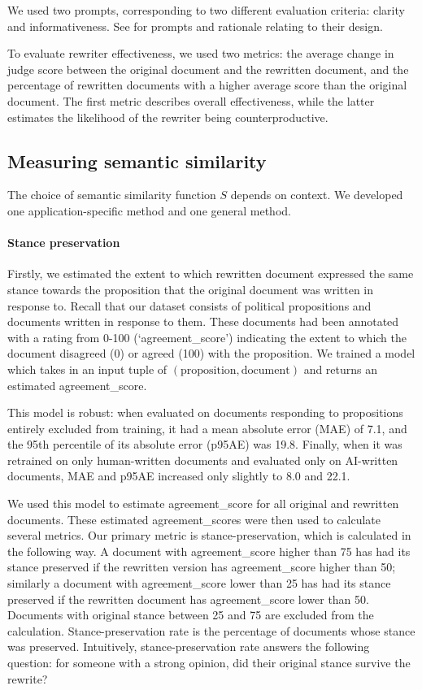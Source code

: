 \documentclass{article}
\begin{document}


We used two prompts, corresponding to two different evaluation criteria: clarity and informativeness. See  for prompts and rationale relating to their design.

To evaluate rewriter effectiveness, we used two metrics: the average change in judge score between the original document and the rewritten document, and the percentage of rewritten documents with a higher average score than the original document. The first metric describes overall effectiveness, while the latter estimates the likelihood of the rewriter being counterproductive.

\subsection{Measuring semantic similarity}

The choice of semantic similarity function $S$ depends on context. We developed one application-specific method and one general method.

\paragraph{Stance preservation} Firstly, we estimated the extent to which rewritten document expressed the same stance towards the proposition that the original document was written in response to. Recall that our dataset consists of political propositions and documents written in response to them. These documents had been annotated with a rating from 0-100 (`agreement\_score') indicating the extent to which the document disagreed (0) or agreed (100) with the proposition. We trained a model which takes in an input tuple of $(\text{proposition}, \text{document})$ and returns an estimated agreement\_score. 

This model is robust: when evaluated on documents responding to propositions entirely excluded from training, it had a mean absolute error (MAE) of 7.1, and the 95th percentile of its absolute error (p95AE) was 19.8. Finally, when it was retrained on only human-written documents and evaluated only on AI-written documents, MAE and p95AE increased only slightly to 8.0 and 22.1. 

We used this model to estimate agreement\_score for all original and rewritten documents. These estimated agreement\_scores were then used to calculate several metrics. Our primary metric is stance-preservation, which is calculated in the following way. A document with agreement\_score higher than 75 has had its stance preserved if the rewritten version has agreement\_score higher than 50; similarly a document with agreement\_score lower than 25 has had its stance preserved if the rewritten document has agreement\_score lower than 50. Documents with original stance between 25 and 75 are excluded from the calculation. Stance-preservation rate is the percentage of documents whose stance was preserved. Intuitively, stance-preservation rate answers the following question: for someone with a strong opinion, did their original stance survive the rewrite?
\end{document}
